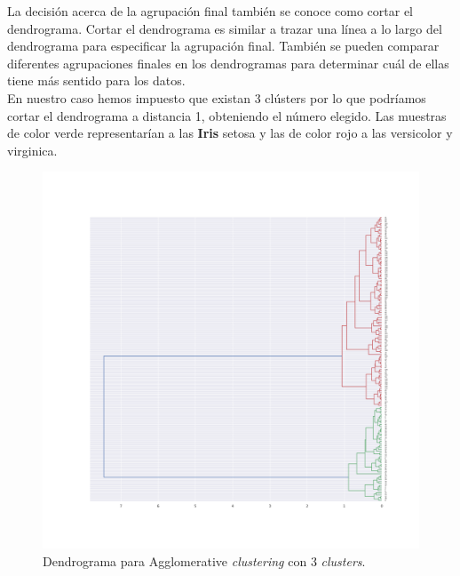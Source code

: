 \documentclass[a4paper, 20pt]{article}
\begin{document}
La decisión acerca de la agrupación final también se conoce como cortar el dendrograma. Cortar el dendrograma es similar a trazar una línea a lo largo del dendrograma para especificar la agrupación final. También se pueden comparar diferentes agrupaciones finales en los dendrogramas para determinar cuál de ellas tiene más sentido para los datos.\\

En nuestro caso hemos impuesto que existan 3 clústers por lo que podríamos cortar el dendrograma a distancia 1, obteniendo el número elegido. Las muestras de color verde representarían a las \textbf{Iris} setosa y las de color rojo a las versicolor y virginica.

\begin{figure}[h]
\centering
\includegraphics[scale=0.35]{dani/dendrogramAggClusterIRIS.png}
\caption{Dendrograma para Agglomerative \textit{clustering} con 3 \textit{clusters}.}
\label{dac}
\end{figure}

\clearpage
\end{document}
